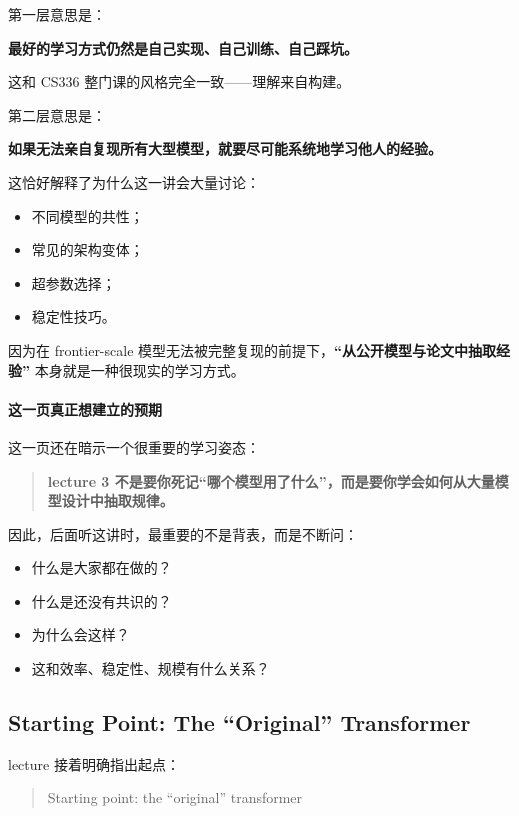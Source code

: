 \documentclass[a4paper,UTF8]{article}
\numberwithin{equation}{section}
\begin{document}
第一层意思是：
\begin{center}
\textbf{最好的学习方式仍然是自己实现、自己训练、自己踩坑。}
\end{center}

这和 CS336 整门课的风格完全一致——理解来自构建。

第二层意思是：
\begin{center}
\textbf{如果无法亲自复现所有大型模型，就要尽可能系统地学习他人的经验。}
\end{center}

这恰好解释了为什么这一讲会大量讨论：
\begin{itemize}
    \item 不同模型的共性；
    \item 常见的架构变体；
    \item 超参数选择；
    \item 稳定性技巧。
\end{itemize}

因为在 frontier-scale 模型无法被完整复现的前提下，\textbf{“从公开模型与论文中抽取经验”} 本身就是一种很现实的学习方式。

\paragraph{这一页真正想建立的预期}
这一页还在暗示一个很重要的学习姿态：

\begin{quote}
\textbf{lecture 3 不是要你死记“哪个模型用了什么”，而是要你学会如何从大量模型设计中抽取规律。}
\end{quote}

因此，后面听这讲时，最重要的不是背表，而是不断问：
\begin{itemize}
    \item 什么是大家都在做的？
    \item 什么是还没有共识的？
    \item 为什么会这样？
    \item 这和效率、稳定性、规模有什么关系？
\end{itemize}

\subsection{Starting Point: The ``Original'' Transformer}

lecture 接着明确指出起点：
\begin{quote}
Starting point: the ``original'' transformer
\end{quote}
\end{document}

